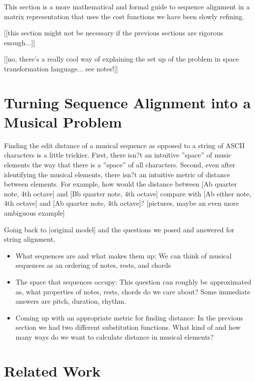 This section is a more mathematical and formal guide to sequence alignment in a matrix representation that uses the cost functions we have been slowly refining. 

[[this section might not be necessary if the previous sections are rigorous enough...]] 

[[no, there's a really cool way of explaining the set up of the problem in space transformation language... see notes!]]

\section{Turning Sequence Alignment into a Musical Problem}
Finding the edit distance of a musical sequence as opposed to a string of ASCII characters is a little trickier. First, there isn?t an intuitive ''space'' of music elements the way that there is a ''space'' of all characters. Second, even after identifying the musical elements, there isn?t an intuitive metric of distance between elements. For example, how would the distance between [Ab quarter note, 4th octave] and [Bb quarter note, 4th octave] compare with [Ab either note, 4th octave] and [Ab quarter note, 4th octave]? [pictures, maybe an even more ambiguous example]

Going back to [original model] and the questions we posed and answered for string alignment, 

\begin{itemize}
\item What sequences are and what makes them up: We can think of musical sequences as an ordering of notes, rests, and chords
\item The space that sequences occupy: This question can roughly be approximated as, what properties of notes, rests, chords do we care about? Some immediate answers are pitch, duration, rhythm.
\item Coming up with an appropriate metric for finding distance: In the previous section we had two different substitution functions. What kind of and how many ways do we want to calculate distance in musical elements?
\end {itemize}



\section{Related Work}
